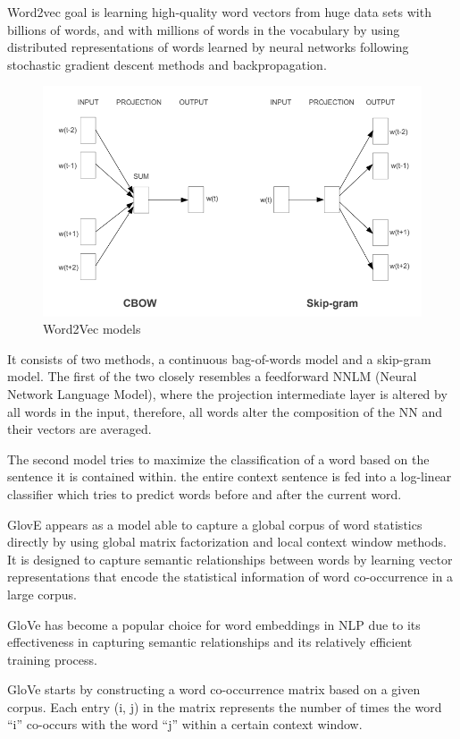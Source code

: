 Word2vec\cite{mikolov2013efficient} goal is learning high-quality word vectors from huge data sets with billions of words, and with millions of words in the vocabulary by using distributed representations of words learned by neural networks following stochastic gradient descent methods and backpropagation.

\begin{figure}[!htp]
    \centering
    \includegraphics[width=.75\textwidth]{fig/embeddings/Word2Vec.png}
    \caption{Word2Vec\cite{mikolov2013efficient} models}
    \label{fig:word2Vec}
\end{figure}

It consists of two methods, a continuous bag-of-words model and a skip-gram model. The first of the two closely resembles a feedforward NNLM (Neural Network Language Model), where the projection intermediate layer is altered by all words in the input, therefore, all words alter the composition of the NN and their vectors are averaged.

The second model tries to maximize the classification of a word based on the sentence it is contained within. the entire context sentence is fed into a log-linear classifier which tries to predict words before and after the current word.

GlovE \cite{pennington2014glove} appears as a model able to capture a global corpus of word statistics directly by using global matrix factorization and local context window methods. It is designed to capture semantic relationships between words by learning vector representations that encode the statistical information of word co-occurrence in a large corpus.

GloVe has become a popular choice for word embeddings in NLP due to its effectiveness in capturing semantic relationships and its relatively efficient training process.

GloVe starts by constructing a word co-occurrence matrix based on a given corpus. Each entry (i, j) in the matrix represents the number of times the word ``i'' co-occurs with the word ``j'' within a certain context window.

